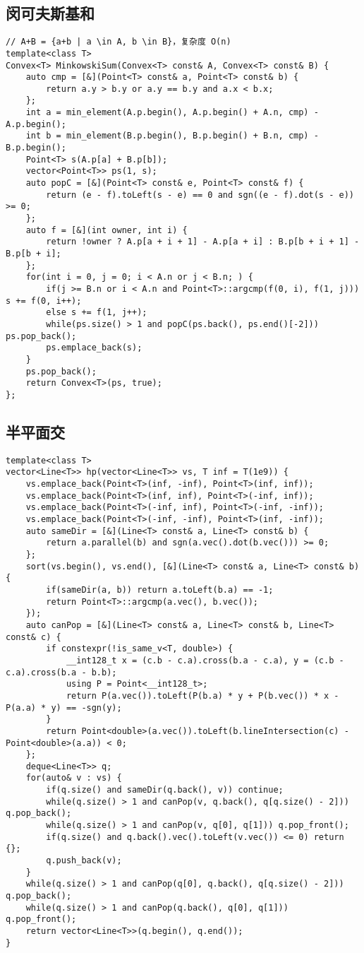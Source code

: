 \subsection{闵可夫斯基和}
\begin{lstlisting}
// A+B = {a+b | a \in A, b \in B}，复杂度 O(n)
template<class T>
Convex<T> MinkowskiSum(Convex<T> const& A, Convex<T> const& B) {
    auto cmp = [&](Point<T> const& a, Point<T> const& b) {
        return a.y > b.y or a.y == b.y and a.x < b.x;
    };
    int a = min_element(A.p.begin(), A.p.begin() + A.n, cmp) - A.p.begin();
    int b = min_element(B.p.begin(), B.p.begin() + B.n, cmp) - B.p.begin();
    Point<T> s(A.p[a] + B.p[b]);
    vector<Point<T>> ps(1, s);
    auto popC = [&](Point<T> const& e, Point<T> const& f) {
        return (e - f).toLeft(s - e) == 0 and sgn((e - f).dot(s - e)) >= 0;
    };
    auto f = [&](int owner, int i) {
        return !owner ? A.p[a + i + 1] - A.p[a + i] : B.p[b + i + 1] - B.p[b + i];
    };
    for(int i = 0, j = 0; i < A.n or j < B.n; ) {
        if(j >= B.n or i < A.n and Point<T>::argcmp(f(0, i), f(1, j))) s += f(0, i++);
        else s += f(1, j++);
        while(ps.size() > 1 and popC(ps.back(), ps.end()[-2])) ps.pop_back();
        ps.emplace_back(s);
    }
    ps.pop_back();
    return Convex<T>(ps, true);
};
\end{lstlisting}

\subsection{半平面交}
\begin{lstlisting}
template<class T>
vector<Line<T>> hp(vector<Line<T>> vs, T inf = T(1e9)) {
    vs.emplace_back(Point<T>(inf, -inf), Point<T>(inf, inf));
    vs.emplace_back(Point<T>(inf, inf), Point<T>(-inf, inf));
    vs.emplace_back(Point<T>(-inf, inf), Point<T>(-inf, -inf));
    vs.emplace_back(Point<T>(-inf, -inf), Point<T>(inf, -inf));
    auto sameDir = [&](Line<T> const& a, Line<T> const& b) {
        return a.parallel(b) and sgn(a.vec().dot(b.vec())) >= 0;
    };
    sort(vs.begin(), vs.end(), [&](Line<T> const& a, Line<T> const& b) {
        if(sameDir(a, b)) return a.toLeft(b.a) == -1;
        return Point<T>::argcmp(a.vec(), b.vec());
    });
    auto canPop = [&](Line<T> const& a, Line<T> const& b, Line<T> const& c) {
        if constexpr(!is_same_v<T, double>) {
            __int128_t x = (c.b - c.a).cross(b.a - c.a), y = (c.b - c.a).cross(b.a - b.b);
            using P = Point<__int128_t>;
            return P(a.vec()).toLeft(P(b.a) * y + P(b.vec()) * x - P(a.a) * y) == -sgn(y);
        }
        return Point<double>(a.vec()).toLeft(b.lineIntersection(c) - Point<double>(a.a)) < 0;
    };
    deque<Line<T>> q;
    for(auto& v : vs) {
        if(q.size() and sameDir(q.back(), v)) continue;
        while(q.size() > 1 and canPop(v, q.back(), q[q.size() - 2])) q.pop_back();
        while(q.size() > 1 and canPop(v, q[0], q[1])) q.pop_front();
        if(q.size() and q.back().vec().toLeft(v.vec()) <= 0) return {};
        q.push_back(v);
    }
    while(q.size() > 1 and canPop(q[0], q.back(), q[q.size() - 2])) q.pop_back();
    while(q.size() > 1 and canPop(q.back(), q[0], q[1])) q.pop_front();
    return vector<Line<T>>(q.begin(), q.end());
}
\end{lstlisting}
